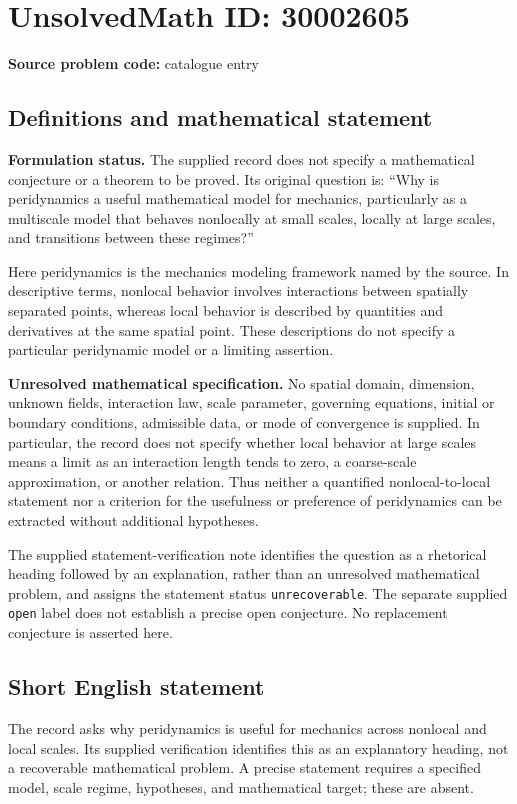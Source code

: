 \documentclass[11pt]{article}
\begin{document}
\section*{UnsolvedMath ID: 30002605}
\textbf{Source problem code:} catalogue entry
\subsection{Definitions and mathematical statement}
\textbf{Formulation status.} The supplied record does not specify a mathematical conjecture or a theorem to be proved. Its original question is: ``Why is peridynamics a useful mathematical model for mechanics, particularly as a multiscale model that behaves nonlocally at small scales, locally at large scales, and transitions between these regimes?''

Here peridynamics is the mechanics modeling framework named by the source. In descriptive terms, nonlocal behavior involves interactions between spatially separated points, whereas local behavior is described by quantities and derivatives at the same spatial point. These descriptions do not specify a particular peridynamic model or a limiting assertion.

\textbf{Unresolved mathematical specification.} No spatial domain, dimension, unknown fields, interaction law, scale parameter, governing equations, initial or boundary conditions, admissible data, or mode of convergence is supplied. In particular, the record does not specify whether local behavior at large scales means a limit as an interaction length tends to zero, a coarse-scale approximation, or another relation. Thus neither a quantified nonlocal-to-local statement nor a criterion for the usefulness or preference of peridynamics can be extracted without additional hypotheses.

The supplied statement-verification note identifies the question as a rhetorical heading followed by an explanation, rather than an unresolved mathematical problem, and assigns the statement status \texttt{unrecoverable}. The separate supplied \texttt{open} label does not establish a precise open conjecture. No replacement conjecture is asserted here.
\subsection{Short English statement}
The record asks why peridynamics is useful for mechanics across nonlocal and local scales. Its supplied verification identifies this as an explanatory heading, not a recoverable mathematical problem. A precise statement requires a specified model, scale regime, hypotheses, and mathematical target; these are absent.
\end{document}
